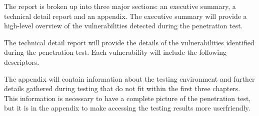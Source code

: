 \documentclass{article}
\begin{document}
            \large The report is broken up into three major sections: an executive summary, a technical detail report and an appendix. The executive summary will provide a high-level overview of the vulnerabilities detected
            during the penetration test.

            \large The technical detail report will provide the details of the vulnerabilities identified during the penetration test. Each vulnerability will include the following descriptors.
            
            \large The appendix will contain information about the testing environment and further details gathered during testing that do not fit within the first three chapters. 
            This information is necessary to have a complete picture of the penetration test, but it is in the appendix to make accessing the testing results more userfriendly.


            \newpage
\end{document}
